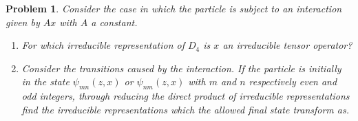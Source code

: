 \documentclass[UTF8,10pt,a4paper]{article}
\theoremstyle{Problem}
\newtheorem{prob}{Problem}
\theoremstyle{Solution}
\begin{document}
\begin{prob}
    Consider the case in which the particle is subject to an interaction given by $Ax$ with $A$ a constant.
    \begin{enumerate}
        \item[(a)] For which irreducible representation of $D_4$ is $x$ an irreducible tensor operator?
        \item[(b)] Consider the transitions caused by the interaction. If the particle is initially in the state $\psi_{mn}(z,x)$ or $\psi_{nm}(z,x)$ with $m$ and $n$ respectively even and odd integers, through reducing the direct product of irreducible representations find the irreducible representations which the allowed final state transform as.
    \end{enumerate}
\end{prob}
\end{document}
